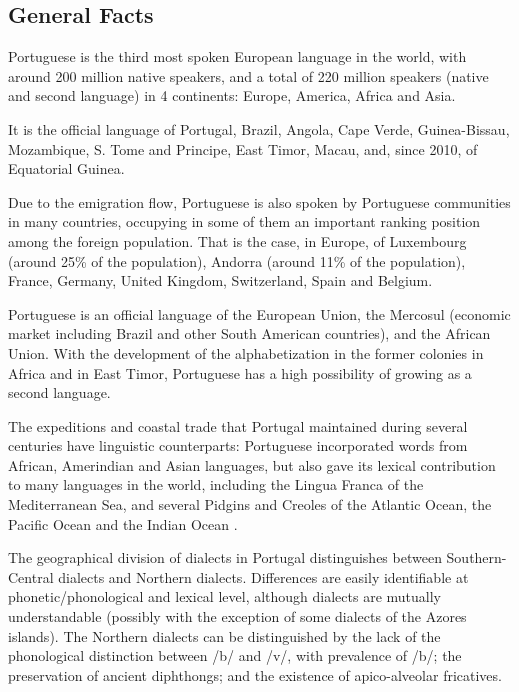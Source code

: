 \clearpage


\begin{multicols}{2}

\subsection{General Facts}

Portuguese is the third most spoken European language in the world, with around 200 million native speakers, and a total of 220 million speakers (native and second language) in 4 continents: Europe, America, Africa and Asia\cite{observatorio}\cite{ethnologue}. 

   It is the official language of Portugal, Brazil, Angola, Cape Verde, Guinea-Bissau, Mozambique, S. Tome and Principe, East Timor, Macau, and, since 2010, of Equatorial Guinea. 

   Due to the emigration flow\cite{stat1}\cite{obsemig}, Portuguese is also spoken by Portuguese communities in many countries, occupying in some of them an important ranking position among the foreign population. That is the case, in Europe, of Luxembourg (around 25\% of the population), Andorra (around 11\% of the population), France, Germany, United Kingdom, Switzerland, Spain and Belgium\cite{linha}.


 Portuguese is an official language of the European Union, the Mercosul (economic market including Brazil and other South American countries), and the African Union. With the development of the alphabetization in the former colonies in Africa and in East Timor, Portuguese has a high possibility of growing as a second language. 

The expeditions and coastal trade that Portugal maintained during several centuries have linguistic counterparts: Portuguese incorporated words from African, Amerindian and Asian languages, but also gave its lexical contribution to many languages in the world, including the Lingua Franca of the Mediterranean Sea, and several Pidgins and Creoles of the Atlantic Ocean, the Pacific Ocean and the Indian Ocean\cite{andrade} \cite{camoes}.

   The geographical division of dialects in Portugal\cite{cintra} distinguishes between Southern-Central dialects and Northern dialects. Differences are easily identifiable at phonetic/phonological and lexical level, although dialects are mutually understandable (possibly with the exception of some dialects of the Azores islands). The Northern dialects can be distinguished by the lack of the phonological distinction between /b/ and /v/, with prevalence of /b/; the preservation of ancient diphthongs; and the existence of apico-alveolar fricatives. 


\end{multicols}
